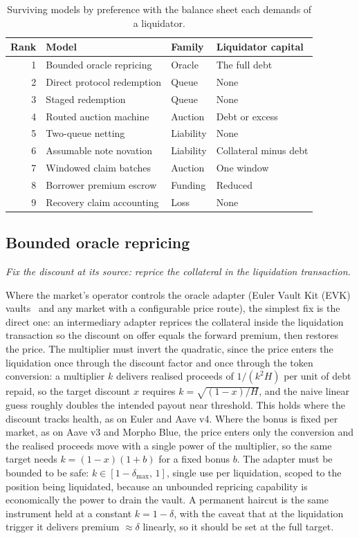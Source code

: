 \documentclass[11pt,a4paper]{article}
\newcommand{\model}[2]{\subsection{#1}\noindent\textit{#2}\medskip}
\begin{document}
\begin{table}[h]
\centering
\begin{tabular}{@{}rlll@{}}
\toprule
Rank & Model & Family & Liquidator capital \\
\midrule
1 & Bounded oracle repricing & Oracle & The full debt \\
2 & Direct protocol redemption & Queue & None \\
3 & Staged redemption & Queue & None \\
4 & Routed auction machine & Auction & Debt or excess \\
5 & Two-queue netting & Liability & None \\
6 & Assumable note novation & Liability & Collateral minus debt \\
7 & Windowed claim batches & Auction & One window \\
8 & Borrower premium escrow & Funding & Reduced \\
9 & Recovery claim accounting & Loss & None \\
\bottomrule
\end{tabular}
\caption{Surviving models by preference with the balance sheet each demands of a liquidator.}
\end{table}

\model{Bounded oracle repricing}{Fix the discount at its source: reprice the collateral in the liquidation transaction.}

Where the market's operator controls the oracle adapter (Euler Vault Kit (EVK) vaults~\cite{eulerdocs} and any market with a configurable price route), the simplest fix is the direct one: an intermediary adapter reprices the collateral inside the liquidation transaction so the discount on offer equals the forward premium, then restores the price. The multiplier must invert the quadratic, since the price enters the liquidation once through the discount factor and once through the token conversion: a multiplier $k$ delivers realised proceeds of $1/(k^2 H)$ per unit of debt repaid, so the target discount $x$ requires $k = \sqrt{(1-x)/H}$, and the naive linear guess roughly doubles the intended payout near threshold. This holds where the discount tracks health, as on Euler and Aave v4. Where the bonus is fixed per market, as on Aave v3 and Morpho Blue, the price enters only the conversion and the realised proceeds move with a single power of the multiplier, so the same target needs $k = (1-x)(1+b)$ for a fixed bonus $b$. The adapter must be bounded to be safe: $k \in [1-\delta_{\max},\, 1]$, single use per liquidation, scoped to the position being liquidated, because an unbounded repricing capability is economically the power to drain the vault. A permanent haircut is the same instrument held at a constant $k = 1-\delta$, with the caveat that at the liquidation trigger it delivers premium $\approx \delta$ linearly, so it should be set at the full target.
\end{document}
